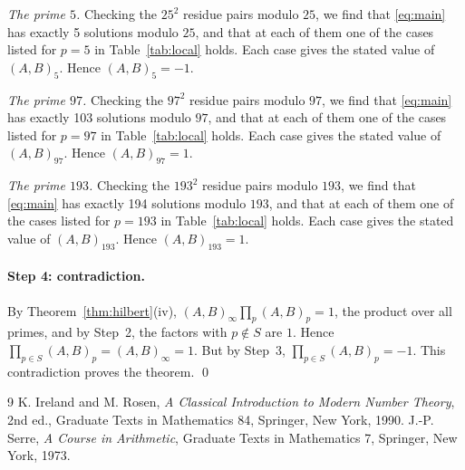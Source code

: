 \documentclass[11pt]{article}
\begin{document}
\emph{The prime $5$.} Checking the $25^2$ residue pairs modulo $25$, we find that \eqref{eq:main} has exactly 5 solutions modulo $25$, and that at each of them one of the cases listed for $p=5$ in Table~\ref{tab:local} holds. Each case gives the stated value of $(A,B)_{5}$. Hence $(A,B)_{5}=-1$.

\emph{The prime $97$.} Checking the $97^2$ residue pairs modulo $97$, we find that \eqref{eq:main} has exactly 103 solutions modulo $97$, and that at each of them one of the cases listed for $p=97$ in Table~\ref{tab:local} holds. Each case gives the stated value of $(A,B)_{97}$. Hence $(A,B)_{97}=1$.

\emph{The prime $193$.} Checking the $193^2$ residue pairs modulo $193$, we find that \eqref{eq:main} has exactly 194 solutions modulo $193$, and that at each of them one of the cases listed for $p=193$ in Table~\ref{tab:local} holds. Each case gives the stated value of $(A,B)_{193}$. Hence $(A,B)_{193}=1$.

\paragraph{Step 4: contradiction.} By Theorem~\ref{thm:hilbert}(iv), $(A,B)_\infty\prod_p(A,B)_p=1$, the product over all primes, and by Step~2, the factors with $p\notin S$ are $1$. Hence $\prod_{p\in S}(A,B)_p=(A,B)_\infty=1$. But by Step~3, $\prod_{p\in S}(A,B)_p=-1$. This contradiction proves the theorem.
\qed

\begin{thebibliography}{9}
 K. Ireland and M. Rosen, \emph{A Classical Introduction to Modern Number Theory}, 2nd ed., Graduate Texts in Mathematics 84, Springer, New York, 1990.
 J.-P. Serre, \emph{A Course in Arithmetic}, Graduate Texts in Mathematics 7, Springer, New York, 1973.
\end{thebibliography}
\end{document}
